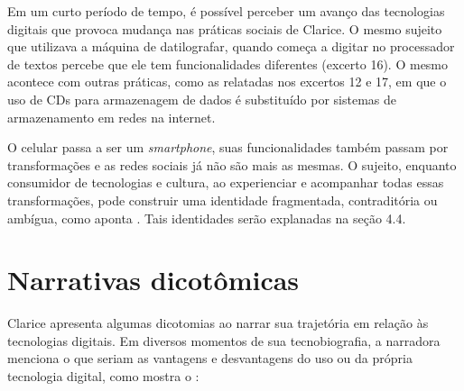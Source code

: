 \documentclass{textolivre-html}
\begin{document}
Em um curto período de tempo, é possível perceber um avanço das tecnologias digitais que provoca mudança nas práticas sociais de Clarice. O mesmo sujeito que utilizava a máquina de datilografar, quando começa a digitar no processador de textos percebe que ele tem funcionalidades diferentes (excerto 16). O mesmo acontece com outras práticas, como as relatadas nos excertos 12 e 17, em que o uso de CDs para armazenagem de dados é substituído por sistemas de armazenamento em redes na internet. 

O celular passa a ser um \textit{smartphone}, suas funcionalidades também passam por transformações e as redes sociais já não são mais as mesmas. O sujeito, enquanto consumidor de tecnologias e cultura, ao experienciar e acompanhar todas essas transformações, pode construir uma identidade fragmentada, contraditória ou ambígua, como aponta \textcite{moita2002}. Tais identidades serão explanadas na seção 4.4.

\section{Narrativas dicotômicas}\label{sec-dicotomicas}
Clarice apresenta algumas dicotomias ao narrar sua trajetória em relação às tecnologias digitais. Em diversos momentos de sua tecnobiografia, a narradora menciona o que seriam as vantagens e desvantagens do uso ou da própria tecnologia digital, como mostra o :
\end{document}
